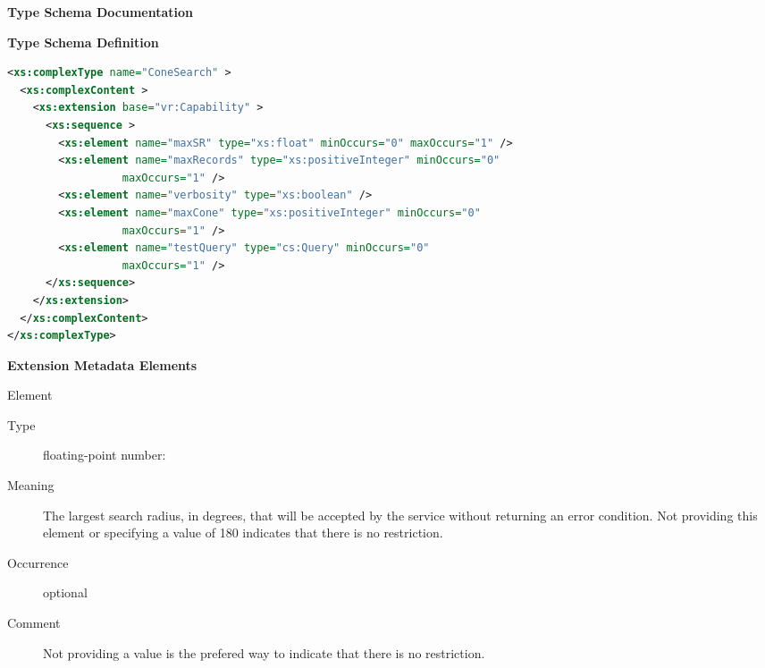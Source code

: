 \documentclass[11pt,a4paper]{ivoa}
\begin{document}
\begin{generated}
\begingroup
        \renewcommand*\descriptionlabel[1]{%
        \hbox to 5.5em{\emph{#1}\hfil}}\vspace{2ex}\noindent\textbf{ Type Schema Documentation}


\vspace{1ex}\noindent\textbf{ Type Schema Definition}

\begin{lstlisting}[language=XML,basicstyle=\footnotesize]
<xs:complexType name="ConeSearch" >
  <xs:complexContent >
    <xs:extension base="vr:Capability" >
      <xs:sequence >
        <xs:element name="maxSR" type="xs:float" minOccurs="0" maxOccurs="1" />
        <xs:element name="maxRecords" type="xs:positiveInteger" minOccurs="0"
                  maxOccurs="1" />
        <xs:element name="verbosity" type="xs:boolean" />
        <xs:element name="maxCone" type="xs:positiveInteger" minOccurs="0"
                  maxOccurs="1" />
        <xs:element name="testQuery" type="cs:Query" minOccurs="0"
                  maxOccurs="1" />
      </xs:sequence>
    </xs:extension>
  </xs:complexContent>
</xs:complexType>
\end{lstlisting}

\vspace{0.5ex}\noindent\textbf{ Extension Metadata Elements}

\begingroup\small\begin{bigdescription}\item[Element \xmlel{maxSR}]
\begin{description}
\item[Type] floating-point number: 
\item[Meaning] The largest search radius, in degrees, that will be
                        accepted by the service without returning an error
                        condition.  Not providing this element or
                        specifying a value of 180 indicates that there
                        is no restriction.
\item[Occurrence] optional
\item[Comment] Not providing a value is the prefered way to indicate
                        that there is no restriction.


\end{description}
\end{bigdescription}
\end{generated}
\end{document}
